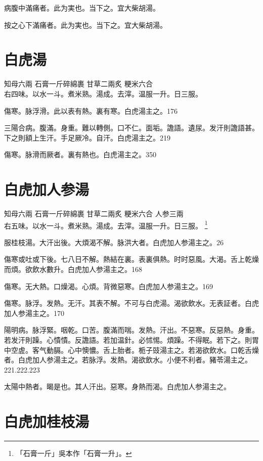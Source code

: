 病腹中滿痛者。此为実也。当下之。宜大柴胡湯。{\wuben}

按之心下滿痛者。此为実也。当下之。宜大柴胡湯。{\dengben}

\section{白虎湯}

知母{\scriptsize 六兩} 石膏{\scriptsize 一斤碎綿裹} 甘草{\scriptsize 二兩炙} 粳米{\scriptsize 六合}\\
右四味。以水一斗。煮米熟。湯成。去滓。温服一升。日三服。

傷寒。脉浮滑。此以表有熱。裏有寒。白虎湯主之。176

三陽合病。腹滿。身重。難以轉側。口不仁。面垢。譫語。遺尿。发汗則譫語{\khaaitp 甚}。下之則額上生汗。手足厥冷。自汗。白虎湯主之。219

傷寒。脉滑而厥者。裏有熱也。白虎湯主之。350

\section{白虎加人参湯}

知母{\scriptsize 六兩} 石膏{\scriptsize 一斤碎綿裹} 甘草{\scriptsize 二兩炙} 粳米{\scriptsize 六合} 人参{\scriptsize 三兩}\\
右五味。以水一斗。煮米熟。湯成。去滓。温服一升。日三服。
	\footnote{
	「石膏一斤」吳本作「石膏一升」。
	}

服桂枝湯。大汗出{\khaaitp 後}。大煩渴不解。脉洪大者。白虎{\khaaitp 加人参}湯主之。26

傷寒或吐或下後。七八日不解。熱結在裏。表裏俱熱。时时惡風。大渴。舌上乾燥而煩。欲飲水數升。白虎{\khaaitp 加人参}湯主之。168

傷寒。无大熱。口燥渴。心煩。背微惡寒。白虎{\khaaitp 加人参}湯主之。169

傷寒。脉浮。发熱。无汗。其表不解。不可与白虎湯。渴欲飲水。无表証者。白虎{\khaaitp 加人参}湯主之。170

陽明病。脉浮緊。咽乾。口苦。腹滿而喘。发熱。汗出。不惡寒。反惡熱。身重。若发汗則躁。心憒憒。反譫語。若加温針。必怵惕。煩躁。不得眠。若下之。則胃中空虗。客气動膈。心中懊憹。舌上胎者。栀子{\khaaitp 豉}湯主之。若渴欲飲水。口乾舌燥者。白虎{\khaaitp 加人参}湯主之。若脉浮。发熱。渴欲飲水。小便不利者。豬苓湯主之。221.222.223

太陽中熱者。暍是也。其人汗出。惡寒。身熱而渴。白虎{\khaaitp 加人参}湯主之。

\section{白虎加桂枝湯}

